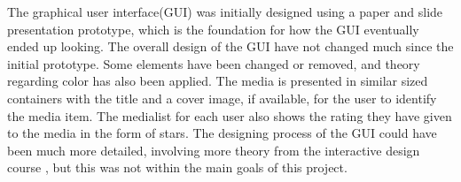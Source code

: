 The graphical user interface(GUI) was initially designed using a paper and slide presentation prototype, which is the foundation for how the GUI eventually ended up looking. The overall design of the GUI have not changed much since the initial prototype. Some elements have been changed or  removed, and theory regarding color has also been applied. The media is presented in similar sized containers with the title and a cover image, if available, for the user to identify the media item. The medialist for each user also shows the rating they have given to the media in the form of stars. The designing process of the GUI could have been much more detailed, involving more theory from the interactive design course \cite{DEBBook}, but this was not within the main goals of this project.